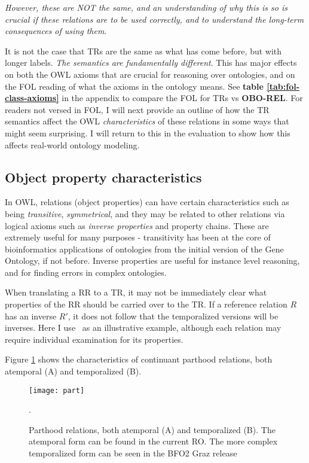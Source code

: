 \documentclass{bioinfo}
\def\partOf{\pr{part\_of}}
\def\OBOREL{\textbf{OBO-REL}}
\begin{document}
\emph{However, these are NOT the same, and an understanding of why
  this is so is crucial if these relations are to be used correctly,
  and to understand the long-term consequences of using them}.

It is not the case that TRs are the same as what has come before, but
with longer labels. \emph{The semantics are fundamentally different}.
This has major effects on both the OWL axioms that are crucial for
reasoning over ontologies, and on the FOL reading of what the axioms
in the ontology means. See \textbf{table \ref{tab:fol-class-axioms}}
in the appendix to compare the FOL for TRs vs \OBOREL. For readers not
versed in FOL, I will next provide an outline of how the TR semantics
affect the OWL \emph{characteristics} of these relations in some ways
that might seem surprising. I will return to this in the evaluation to
show how this affects real-world ontology modeling.

\subsection{Object property characteristics}

In OWL, relations (object properties) can have certain characteristics
such as being \emph{transitive}, \emph{symmetrical}, and they may be
related to other relations via logical axioms such as \emph{inverse
  properties} and property chains. These are extremely useful for many
purposes - transitivity has been at the core of bioinformatics
applications of ontologies from the initial version of the Gene
Ontology\cite{Ashburner2000}, if not before. Inverse properties are
useful for instance level reasoning, and for finding errors in complex
ontologies.

When translating a RR to a TR, it may not be immediately clear what
properties of the RR should be carried over to the TR. If a reference
relation $R$ has an inverse $R'$, it does not follow that the
temporalized versions will be inverses. Here I use \partOf\ as an
illustrative example, although each relation may require individual
examination for its properties.

Figure \ref{fig:part} shows the characteristics of continuant parthood
relations, both atemporal (A) and temporalized (B).

\begin{figure}
\center
\texttt{[image: part]}
\caption{Parthood relations, both atemporal (A) and temporalized
  (B). The atemporal form can be found in the current RO. The more
  complex temporalized form can be seen in the BFO2 Graz release}.
\label{fig:part}
\end{figure}
\end{document}
